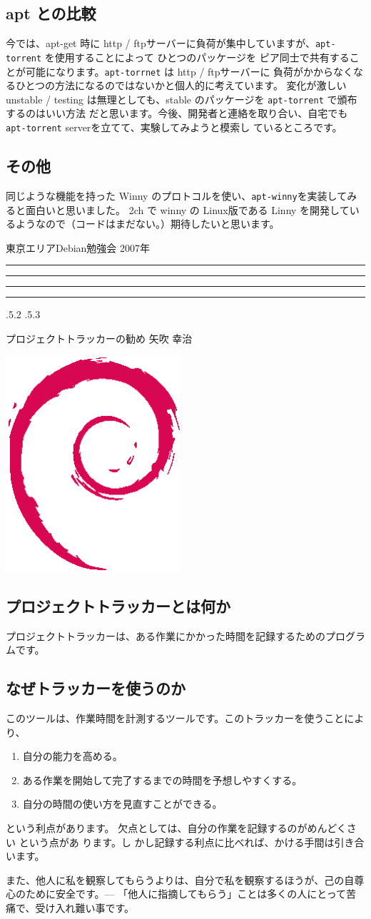 \documentclass[mingoth,a4paper]{jsarticle}
\makeatletter
\newcommand{\debmtgyear}{2007}
\renewcommand{\section}{\@startsection{section}{1}{\z@}%
    {\Cvs \@plus.5\Cdp \@minus.2\Cdp}%
    {.5\Cvs \@plus.3\Cdp}%
    {\normalfont\Huge\headfont\raggedright\centering}} %
\newcommand{\dancersection}[2]{%
\newpage
東京エリアDebian勉強会 \debmtgyear{}年
\hrule
\vspace{0.5mm}
\hrule
%
\vspace{4cm}
\hrule
\vspace{0.5mm}
\hrule
%
\vspace{-7cm}
\begin{minipage}[b]{0.7\hsize}
\section{#1}
\hfill{}#2\\
\vspace{2cm}
\end{minipage}
\begin{minipage}[b]{0.3\hsize}
\hfill{}\includegraphics[height=8cm]{image200502/openlogo-nd.eps}\\
\end{minipage}
%
\vspace{-1cm}
}
\makeatother
\begin{document}
\subsection{apt との比較}
	今では、apt-get 時に http / ftpサーバーに負荷が集中していますが、\texttt{apt-torrent} を使用することによって
	ひとつのパッケージを ピア同士で共有することが可能になります。\texttt{apt-torrnet} は http / ftpサーバーに
	負荷がかからなくなるひとつの方法になるのではないかと個人的に考えています。
	変化が激しい unstable / testing は無理としても、stable のパッケージを \texttt{apt-torrent} で頒布するのはいい方法
	だと思います。今後、開発者と連絡を取り合い、自宅でも \texttt{apt-torrent} serverを立てて、実験してみようと模索し
	ているところです。
	
\subsection{その他}
 同じような機能を持った Winny のプロトコルを使い、\texttt{apt-winny}を実装してみると面白いと思いました。
 2ch で winny の Linux版である Linny を開発しているようなので（コードはまだない。）期待したいと思います。


\dancersection{プロジェクトトラッカーの勧め}{矢吹 幸治}

\subsection{プロジェクトトラッカーとは何か}
プロジェクトトラッカーは、ある作業にかかった時間を記録するためのプログラムです。
\subsection{なぜトラッカーを使うのか}
このツールは、作業時間を計測するツールです。このトラッカーを使うことにより、

\begin{enumerate}
 \item 自分の能力を高める。
 \item ある作業を開始して完了するまでの時間を予想しやすくする。
 \item 自分の時間の使い方を見直すことができる。
\end{enumerate}

という利点があります。
欠点としては、自分の作業を{\large 記録するのがめんどくさい }という点があ
ります。{\large し
かし記録する利点に比べれば、かける手間は引き合います。}

また、他人に私を観察してもらうよりは、自分で私を観察するほうが、己の自尊
心のために安全です。--- 「他人に指摘してもらう」ことは多くの人にとって苦
痛で、受け入れ難い事です。
\end{document}
